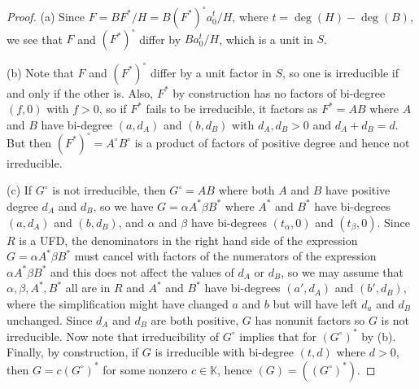 \documentclass[12pt]{amsart}
\numberwithin{equation}{section}
\theoremstyle{definition}
\newcommand{\KK}{ \ensuremath{\mathbb{K}}}
\begin{document}
\begin{proof}
(a) Since $F=BF^*/H=B(F^*)^\circ a_0^t/H$, where $t=\deg(H)-\deg(B)$, we see that
$F$ and $(F^*)^\circ$ differ by $Ba_0^t/H$, which is a unit in $S$.

(b) Note that $F$ and $(F^*)^\circ$ differ by a unit factor in $S$, so one is irreducible if and only if the other is.
Also, $F^*$ by construction has no factors of bi-degree $(f,0)$ with $f>0$, so if $F^*$ fails to be irreducible, it factors as
$F^*=AB$ where $A$ and $B$ have bi-degree $(a,d_A)$ and $(b,d_B)$ with $d_A,d_B>0$ and $d_A+d_B=d$.
But then $(F^*)^\circ=A^\circ B^\circ$ is a product of factors of positive degree and hence not irreducible.

(c) If $G^\circ$ is not irreducible, then $G^\circ=AB$ where both $A$ and $B$ have positive degree $d_A$ and $d_B$, so we have
$G=\alpha A^*\beta B^*$ where $A^*$ and $B^*$ have bi-degrees $(a,d_A)$ and $(b,d_B)$, and $\alpha$ and $\beta$ have bi-degrees
$(t_\alpha,0)$ and $(t_\beta,0)$. Since $R$ is a UFD, the denominators in the right hand side of the expression $G=\alpha A^*\beta B^*$ must
cancel with factors of  the numerators of the expression $\alpha A^*\beta B^*$ and this does not affect the values of $d_A$ or $d_B$, 
so we may assume that $\alpha,\beta, A^*, B^*$ all are in $R$ and $A^*$ and $B^*$ have bi-degrees $(a',d_A)$ and $(b',d_B)$,
where the simplification might have changed $a$ and $b$ but will have left $d_a$ and $d_B$ unchanged. Since $d_A$ and $d_B$ are both positive,
$G$ has nonunit factors so $G$ is not irreducible.
Now note that irreducibility of $G^\circ$ implies that for $(G^\circ)^*$ by (b). Finally, by construction, if $G$ is irreducible with bi-degree $(t,d)$ where $d>0$, then
$G=c(G^\circ)^*$ for some nonzero $c\in\KK$, hence $(G)=((G^\circ)^*)$.


\end{proof}
\end{document}
